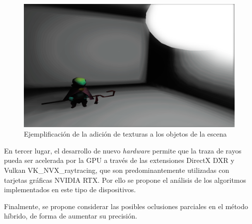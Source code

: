 \begin{figure}[H]
	\centering
	\includegraphics[width=.7\linewidth]{assets/text}
	\caption{Ejemplificación de la adición de texturas a los objetos de la escena}
	\label{img:text}
\end{figure}

En tercer lugar, el desarrollo de nuevo \textit{hardware} permite que la traza de rayos pueda ser acelerada por la GPU a través de las extensiones DirectX DXR y Vulkan VK\_NVX\_raytracing, que son predominantemente utilizadas con tarjetas gráficas NVIDIA RTX. Por ello se propone el análisis de los algoritmos implementados en este tipo de dispositivos.

Finalmente, se propone considerar las posibles oclusiones parciales en el método híbrido, de forma de aumentar su precisión.